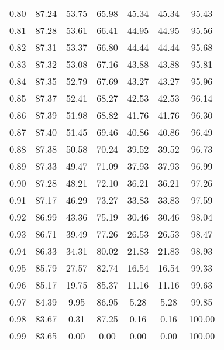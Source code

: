 \begin{tabular}{|c|c|c|c|c|c|c|}
      0.80 &     87.24 &     53.75 &      65.98 &   45.34 &      45.34 &         95.43 \\
      0.81 &     87.28 &     53.61 &      66.41 &   44.95 &      44.95 &         95.56 \\
      0.82 &     87.31 &     53.37 &      66.80 &   44.44 &      44.44 &         95.68 \\
      0.83 &     87.32 &     53.08 &      67.16 &   43.88 &      43.88 &         95.81 \\
      0.84 &     87.35 &     52.79 &      67.69 &   43.27 &      43.27 &         95.96 \\
      0.85 &     87.37 &     52.41 &      68.27 &   42.53 &      42.53 &         96.14 \\
      0.86 &     87.39 &     51.98 &      68.82 &   41.76 &      41.76 &         96.30 \\
      0.87 &     87.40 &     51.45 &      69.46 &   40.86 &      40.86 &         96.49 \\
      0.88 &     87.38 &     50.58 &      70.24 &   39.52 &      39.52 &         96.73 \\
      0.89 &     87.33 &     49.47 &      71.09 &   37.93 &      37.93 &         96.99 \\
      0.90 &     87.28 &     48.21 &      72.10 &   36.21 &      36.21 &         97.26 \\
      0.91 &     87.17 &     46.29 &      73.27 &   33.83 &      33.83 &         97.59 \\
      0.92 &     86.99 &     43.36 &      75.19 &   30.46 &      30.46 &         98.04 \\
      0.93 &     86.71 &     39.49 &      77.26 &   26.53 &      26.53 &         98.47 \\
      0.94 &     86.33 &     34.31 &      80.02 &   21.83 &      21.83 &         98.93 \\
      0.95 &     85.79 &     27.57 &      82.74 &   16.54 &      16.54 &         99.33 \\
      0.96 &     85.17 &     19.75 &      85.37 &   11.16 &      11.16 &         99.63 \\
      0.97 &     84.39 &      9.95 &      86.95 &    5.28 &       5.28 &         99.85 \\
      0.98 &     83.67 &      0.31 &      87.25 &    0.16 &       0.16 &        100.00 \\
      0.99 &     83.65 &      0.00 &       0.00 &    0.00 &       0.00 &        100.00 \\
\bottomrule
\end{tabular}
